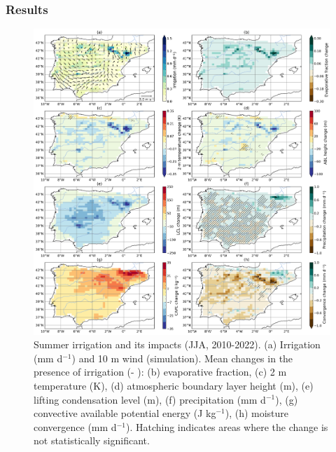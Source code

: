 \subsubsection{Results}
\begin{figure}[htbp]
    \centering
    \includegraphics[width=15cm]{images/chap4/article/f07_v2.png}
    \caption{Summer irrigation and its impacts (JJA, 2010-2022). (a) Irrigation (mm d$^{-1}$) and 10 m wind (\irr simulation). Mean changes in the presence of irrigation (\irr - \noirr): (b) evaporative fraction, (c) 2 m temperature (K), (d) atmospheric boundary layer height (m), (e) lifting condensation level (m), (f) precipitation (mm d$^{-1}$), (g) convective available potential energy (J kg$^{-1}$), (h) moisture convergence (mm d$^{-1}$). Hatching indicates areas where the change is not statistically significant.}
    \label{fig:diff_sig_6vars}
\end{figure}

